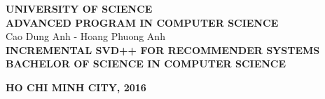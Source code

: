 \begin{titlepage} 
{}
%

\begin{center}
{\selectfont
\textbf{\large UNIVERSITY OF SCIENCE \\[0.25cm]
ADVANCED PROGRAM IN COMPUTER SCIENCE}\\[1cm]

\textsf{\large Cao Dung Anh - Hoang Phuong Anh
}\\[3cm]

\textbf{\color[rgb]{0.255, 0.412, 0.882} \Large 
INCREMENTAL SVD++ FOR RECOMMENDER SYSTEMS
}
}\\[2cm]
\textbf{ \large
BACHELOR OF SCIENCE IN COMPUTER SCIENCE\\[8.5cm]
}


\textbf{ \normalsize
HO CHI MINH CITY, 2016
}
\end{center}

\end{titlepage}
